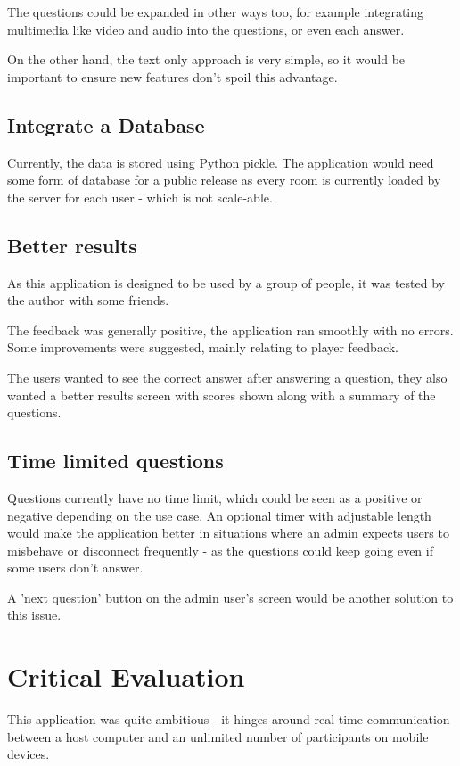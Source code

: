 \documentclass[10pt, a4paper]{article}
\begin{document}
	The questions could be expanded in other ways too, for example integrating multimedia like video and audio into the questions, or even each answer.
	
	On the other hand, the text only approach is very simple, so it would be important to ensure new features don't spoil this advantage.
	
	\subsection{Integrate a Database}
	Currently, the data is stored using Python pickle. The application would need some form of database for a public release as every room is currently loaded by the server for each user - which is not scale-able. 
	
	\subsection{Better results}
	As this application is designed to be used by a group of people, it was tested by the author with some friends. 
	
	The feedback was generally positive, the application ran smoothly with no errors. Some improvements were suggested, mainly relating to player feedback.
	
	The users wanted to see the correct answer after answering a question, they also wanted a better results screen with scores shown along with a summary of the questions.
	
	\subsection{Time limited questions}
	Questions currently have no time limit, which could be seen as a positive or negative depending on the use case. An optional timer with adjustable length would make the application better in situations where an admin expects users to misbehave or disconnect frequently - as the questions could keep going even if some users don't answer. 
	
	A 'next question' button on the admin user's screen would be another solution to this issue.
	
	\section{Critical Evaluation}
	
	This application was quite ambitious - it hinges around real time communication between a host computer and an unlimited number of participants on mobile devices.
	
\end{document}
